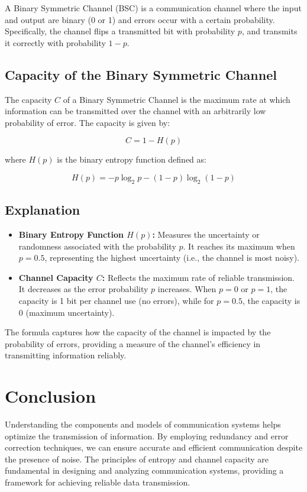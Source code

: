 \documentclass{article}
\begin{document}
A Binary Symmetric Channel (BSC) is a communication channel where the input and output are binary (0 or 1) and errors occur with a certain probability. Specifically, the channel flips a transmitted bit with probability \( p \), and transmits it correctly with probability \( 1 - p \).

\subsection{Capacity of the Binary Symmetric Channel}

The capacity \( C \) of a Binary Symmetric Channel is the maximum rate at which information can be transmitted over the channel with an arbitrarily low probability of error. The capacity is given by:

\[
C = 1 - H(p)
\]

where \( H(p) \) is the binary entropy function defined as:

\[
H(p) = -p \log_2 p - (1-p) \log_2 (1-p)
\]

\subsection{Explanation}

\begin{itemize}
    \item \textbf{Binary Entropy Function \( H(p) \):} Measures the uncertainty or randomness associated with the probability \( p \). It reaches its maximum when \( p = 0.5 \), representing the highest uncertainty (i.e., the channel is most noisy).
    
    \item \textbf{Channel Capacity \( C \):} Reflects the maximum rate of reliable transmission. It decreases as the error probability \( p \) increases. When \( p = 0 \) or \( p = 1 \), the capacity is 1 bit per channel use (no errors), while for \( p = 0.5 \), the capacity is 0 (maximum uncertainty).
\end{itemize}

The formula captures how the capacity of the channel is impacted by the probability of errors, providing a measure of the channel's efficiency in transmitting information reliably.


\section{Conclusion}
Understanding the components and models of communication systems helps optimize the transmission of information. By employing redundancy and error correction techniques, we can ensure accurate and efficient communication despite the presence of noise. The principles of entropy and channel capacity are fundamental in designing and analyzing communication systems, providing a framework for achieving reliable data transmission.
\end{document}
